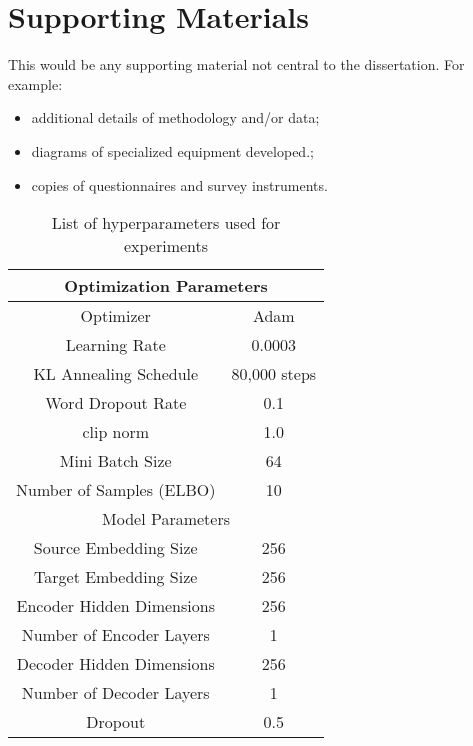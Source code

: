 \chapter{Supporting Materials}

This would be any supporting material not central to the dissertation.
For example:
\begin{itemize}
\item additional details of methodology and/or data;
\item diagrams of specialized equipment developed.;
\item copies of questionnaires and survey instruments.
\end{itemize}

\begin{table}[]
	\caption{List of hyperparameters used for experiments }
	\label{tab:hyperparams}
	\center
	\begin{tabular}{|c|c|}
		\hline
		\multicolumn{2}{|c|}{\textbf{Optimization Parameters}} \\ \hline
		Optimizer                        & Adam                \\ \hline
		Learning Rate                    & 0.0003              \\ \hline
		KL Annealing Schedule            & 80,000 steps        \\ \hline
		Word Dropout Rate                & 0.1                 \\ \hline
		clip norm                        & 1.0                 \\ \hline
		Mini Batch Size                  & 64                  \\ \hline
		Number of Samples (ELBO)         & 10                  \\ \hline
		\multicolumn{2}{|c|}{Model Parameters}                 \\ \hline
		Source Embedding Size            & 256                 \\ \hline
		Target Embedding Size            & 256                 \\ \hline
		Encoder Hidden Dimensions        & 256                 \\ \hline
		Number of Encoder Layers         & 1                   \\ \hline
		Decoder Hidden Dimensions        & 256                 \\ \hline
		Number of Decoder Layers         & 1                   \\ \hline
		Dropout                          & 0.5                 \\ \hline

\end{tabular}
\end{table}
